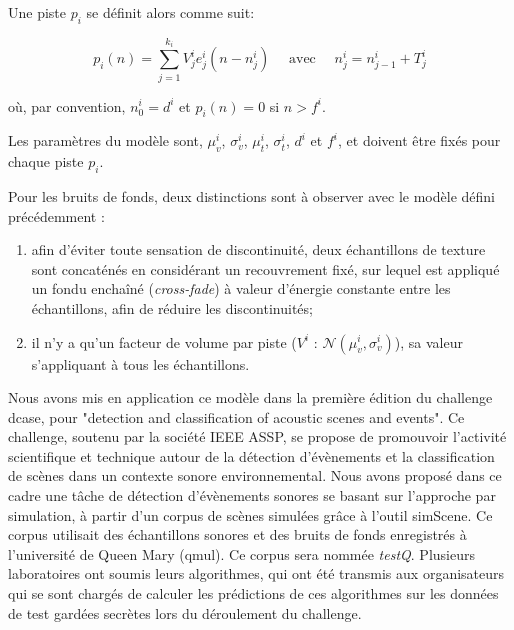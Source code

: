  Une piste $p_i$ se définit alors comme suit:

  \begin{equation}
    \label{eq:ch4_eq2}
    p_{i}(n)= \sum_{j=1}^{k_i} V_j^i e_j^i(n-n_j^i) \quad \textrm{ avec } \quad n_j^i=n_{j-1}^i + T_j^i
  \end{equation}

  où, par convention, $n^i_0=d^i$ et $p_i(n)=0$ si $n>f^i$.

  Les paramètres du modèle sont, $\mu_v^i$, $\sigma_v^i$, $\mu_t^i$, $\sigma_t^i$, $d^i$ et $f^i$, et doivent être fixés pour chaque piste $p_i$. %

  Pour les bruits de fonds, deux distinctions sont à observer avec le modèle défini précédemment :

  \begin{enumerate}
    \item afin d'éviter toute sensation de discontinuité, deux échantillons de texture sont concaténés en considérant un recouvrement fixé, sur lequel est appliqué un fondu enchaîné (\emph{cross-fade}) à valeur d'énergie constante entre les échantillons, afin de réduire les discontinuités;
    \item il n'y a qu'un facteur de volume par piste ($V^i \textrm{ : } \mathcal{N}(\mu_v^{i},\sigma_v^{i})$), sa valeur s'appliquant à tous les échantillons.
  \end{enumerate}


  Nous avons mis en application ce modèle dans la première édition du challenge dcase, pour "detection and classification of acoustic scenes and events". Ce challenge, soutenu par la société IEEE ASSP, se propose de promouvoir l'activité scientifique et technique autour de la détection d'évènements et la classification de scènes dans un contexte sonore environnemental. Nous avons proposé dans ce cadre une tâche de détection d'évènements sonores se basant sur l'approche par simulation, à partir d'un corpus de scènes simulées grâce à l'outil simScene. Ce corpus utilisait des échantillons sonores et des bruits de fonds enregistrés à l'université de Queen Mary (qmul). Ce corpus sera nommée \emph{testQ}. Plusieurs laboratoires ont soumis leurs algorithmes, qui ont été transmis aux organisateurs qui se sont chargés de calculer les prédictions de ces algorithmes sur les données de test gardées secrètes lors du déroulement du challenge.

